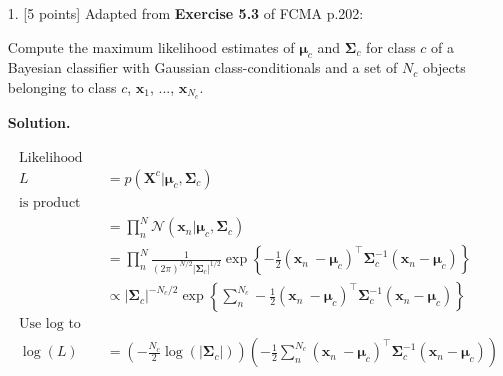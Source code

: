 \documentclass[10pt]{article}
\begin{document}
\newpage
\begin{itemize}

\item[1.]  [5 points]  %
Adapted from {\bf Exercise 5.3} of FCMA p.202:

Compute the maximum likelihood estimates of $\boldsymbol{\mu}_c$ and $\boldsymbol{\Sigma}_c$ for class $c$ of a Bayesian classifier with Gaussian class-conditionals and a set of $N_c$ objects belonging to class $c$, $\mathbf{x}_1$, ..., $\mathbf{x}_{N_c}$. 

{\bf Solution.} 

\begin{eqnarray*}
\begin{aligned}
%
%
\text{Likelihood}
\\
L &= p(\mathbf{X}^c|\boldsymbol{\mu}_c, \boldsymbol{\Sigma}_c)
\\
\text{is product of (Gaussian) probabilities}
\\
&= \prod_n^N \mathcal{N} (\mathbf{x}_n|\boldsymbol{\mu}_c, \boldsymbol{\Sigma}_c)
\\
&= \prod_n^N 
\frac{1}{(2 \pi)^{N/2} | \boldsymbol {\Sigma}_c |^{1/2}} 
\exp 
\left\{ 
-\frac{1}{2} (\mathbf{x}_n\ - \boldsymbol {\mu}_c)^\top \boldsymbol {\Sigma}_c^{-1} (\mathbf{x}_n - \boldsymbol {\mu}_c)
\right\}
\\
&\propto 
|\boldsymbol {\Sigma}_c|^{-{N_c}/2}
\exp 
\left\{ 
\sum_n^{N_c} -\frac{1}{2} (\mathbf{x}_n\ - \boldsymbol {\mu}_c)^\top \boldsymbol {\Sigma}_c^{-1} (\mathbf{x}_n - \boldsymbol {\mu}_c)
\right\}
\\
% 
%
\text{Use log to handle exponent}
\\
\log(L) &= 
\left( - \frac{N_c}{2} \log(|\boldsymbol {\Sigma}_c|) \right)
\left(
-\frac{1}{2} \sum_n^{N_c} (\mathbf{x}_n\ - \boldsymbol {\mu}_c)^\top \boldsymbol {\Sigma}_c^{-1} (\mathbf{x}_n - \boldsymbol {\mu}_c)
\right)
\end{aligned}
\end{eqnarray*}


\end{itemize}
\end{document}
